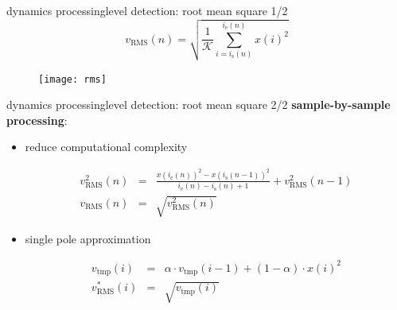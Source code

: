 \begin{frame}{dynamics processing}{level detection: root mean square 1/2}
	\begin{equation*}\label{eq:rms}
		v_{\mathrm{RMS}}(n) = \sqrt{\frac{1}{\mathcal{K}}\sum\limits_{i=i_{\mathrm{s}}(n)}^{i_{\mathrm{e}}(n)}{x(i)^2}}
	\end{equation*}
	\begin{figure}
		\texttt{[image: rms]}
	\end{figure}
\end{frame}
\begin{frame}{dynamics processing}{level detection: root mean square 2/2}
			\textbf{sample-by-sample processing}:
			\begin{itemize}
				\item	reduce computational complexity
					\begin{footnotesize}
					\begin{eqnarray*}
						v^2_{\mathrm{RMS}}(n) &=& \frac{x(i_{\mathrm{e}}(n))^2 - x(i_{\mathrm{s}}(n-1))^2}{i_{\mathrm{e}}(n)-i_{\mathrm{s}}(n) + 1} + v^2_{\mathrm{RMS}}(n-1) \\
						v_{\mathrm{RMS}}(n)	&=& \sqrt{v^2_{\mathrm{RMS}}(n)}
					\end{eqnarray*}
					\end{footnotesize}
				\pause
				\item	single pole approximation
					\begin{footnotesize}
					\begin{eqnarray*}
						v_\mathrm{tmp}(i)	&=& \alpha\cdot v_\mathrm{tmp}(i-1) + (1-\alpha)\cdot x(i)^2\\
						v^*_{\mathrm{RMS}}(i)		&=& \sqrt{v_\mathrm{tmp}(i)}
					\end{eqnarray*}
					\end{footnotesize}
			\end{itemize}
\end{frame}
